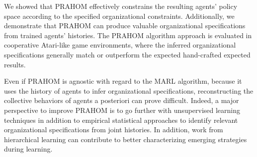 \documentclass{ecai}
\newcounter{relation}
\newcounter{proof}
\begin{document}

We showed that PRAHOM effectively constrains the resulting agents' policy space according to the specified organizational constraints. Additionally, we demonstrate that PRAHOM can produce valuable organizational specifications from trained agents' histories. The PRAHOM algorithm approach is evaluated in cooperative Atari-like game environments, where the inferred organizational specifications generally match or outperform the expected hand-crafted expected results.

Even if PRAHOM is agnostic with regard to the MARL algorithm, because it uses the history of agents to infer organizational specifications, reconstructing the collective behaviors of agents a posteriori can prove difficult. Indeed, a major perspective to improve PRAHOM is to go further with unsupervised learning techniques in addition to empirical statistical approaches to identify relevant organizational specifications from joint histories. In addition, work from hierarchical learning can contribute to better characterizing emerging strategies during learning.
\end{document}
